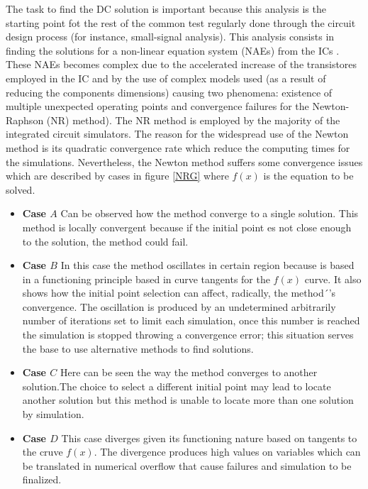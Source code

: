 \documentclass[conference,letterpaper,onecolumn]{IEEEtran}
\begin{document}
The task to find the DC solution is important because this analysis is the starting point fot the rest of the common test regularly done through the circuit design process (for instance, small-signal analysis). This analysis consists in finding the solutions for a non-linear equation system (NAEs) from the ICs \cite{Schwa_book,mnaxx}. These NAEs becomes complex due to the accelerated increase of the transistores employed in the IC and by the use of complex models used (as a result of reducing the components dimensions) causing two phenomena: existence of multiple unexpected operating points and convergence failures for the Newton-Raphson (NR) method). The NR method is employed by the majority of the integrated circuit simulators. The reason for the widespread use of the Newton method is its quadratic convergence rate which reduce the computing times for the simulations. Nevertheless, the Newton method suffers some  convergence issues \cite{cont_quasi,Schwa_book} which are described by cases in figure \ref{NRG} where $f(x)$ is the equation to be solved.

\begin{itemize}
\item {\bf Case $A$}  Can be observed how the method converge to a single solution. This method is locally convergent \cite{Schwa_book} because if the initial point es not close enough to the solution, the method could fail.
\item {\bf Case $B$} In this case the method oscillates in certain region because is based in a functioning principle based in curve tangents for the $f(x)$ curve. It also shows how the initial point selection can affect, radically, the method´'s convergence. The oscillation is produced by an undetermined arbitrarily number of iterations set to limit each simulation, once this number is reached the simulation is stopped throwing a convergence error; this situation serves the base to use alternative methods to find solutions.
\item {\bf Case $C$} Here can be seen the way the method converges to another solution.The choice to select a different initial point may lead to locate another solution but this method is unable to locate more than one solution by simulation. 
\item {\bf Case  $D$} This case diverges given its functioning nature based on tangents to the cruve $f(x)$. The divergence produces high values on variables which can be translated in  numerical overflow that cause failures and simulation to be finalized.
\end{itemize}
\end{document}
